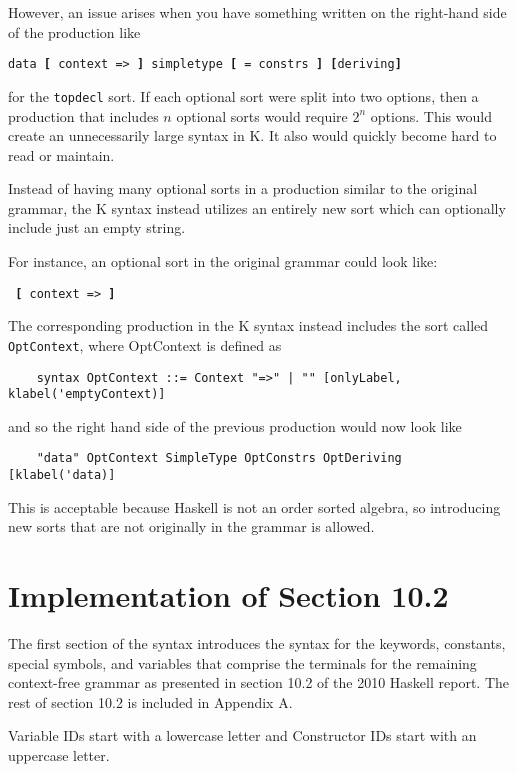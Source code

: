 However, an issue arises when you have something written on the right-hand side of the production like

\texttt{data \textbf{[} context => \textbf{]} simpletype \textbf{[} = constrs \textbf{]} \textbf{[}deriving\textbf{]}}

\noindent
for the \texttt{topdecl} sort. If each optional sort were split into two options, then a production that includes $n$ optional sorts would require $2^n$ options. This would create an unnecessarily large syntax in K. It also would quickly become hard to read or maintain.

Instead of having many optional sorts in a production similar to the original grammar, the K syntax instead utilizes an entirely new sort which can optionally include just an empty string.

For instance, an optional sort in the original grammar could look like:

\texttt{ \textbf{[} context => \textbf{]} }

The corresponding production in the K syntax instead includes the sort called \texttt{OptContext}, where OptContext is defined as

\begin{lstlisting}
	syntax OptContext ::= Context "=>" | "" [onlyLabel, klabel('emptyContext)]
\end{lstlisting}

\noindent
and so the right hand side of the previous production would now look like

\begin{lstlisting}
	"data" OptContext SimpleType OptConstrs OptDeriving  [klabel('data)]
\end{lstlisting}

This is acceptable because Haskell is not an order sorted algebra, so introducing new sorts that are not originally in the grammar is allowed.

\section{Implementation of Section 10.2}
The first section of the syntax introduces the syntax for the keywords, constants, special symbols, and variables that comprise the terminals for the remaining context-free grammar as presented in section 10.2 of the 2010 Haskell report. The rest of section 10.2 is included in Appendix A.

Variable IDs start with a lowercase letter and Constructor IDs start with an uppercase letter.

